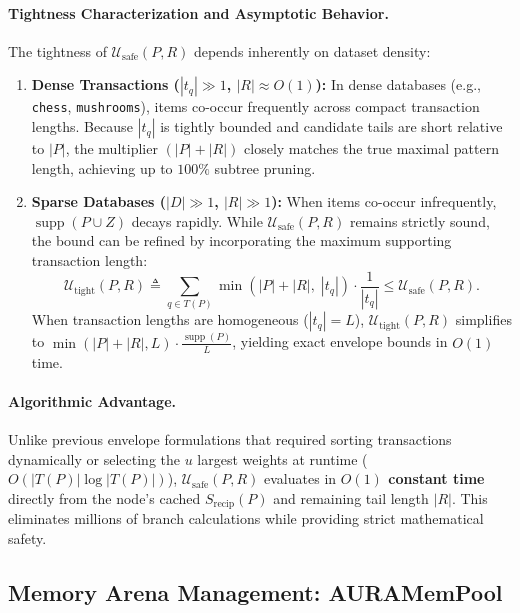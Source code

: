 \documentclass[runningheads,orivec]{llncs}
\newcommand{\supp}{\operatorname{supp}}
\begin{document}
\paragraph{Tightness Characterization and Asymptotic Behavior.}
The tightness of $\mathcal{U}_{\mathrm{safe}}(P, R)$ depends inherently on dataset density:
\begin{enumerate}
    \item \textbf{Dense Transactions ($|t_q| \gg 1$, $|R| \approx O(1)$):} In dense databases (e.g., \texttt{chess}, \texttt{mushrooms}), items co-occur frequently across compact transaction lengths. Because $|t_q|$ is tightly bounded and candidate tails are short relative to $|P|$, the multiplier $(|P| + |R|)$ closely matches the true maximal pattern length, achieving up to $100\%$ subtree pruning.
    \item \textbf{Sparse Databases ($|D| \gg 1$, $|R| \gg 1$):} When items co-occur infrequently, $\supp(P \cup Z)$ decays rapidly. While $\mathcal{U}_{\mathrm{safe}}(P, R)$ remains strictly sound, the bound can be refined by incorporating the maximum supporting transaction length:
    \begin{equation}
    \mathcal{U}_{\mathrm{tight}}(P, R) \triangleq \sum_{q \in T(P)} \min\left(|P| + |R|, \; |t_q|\right) \cdot \frac{1}{|t_q|} \le \mathcal{U}_{\mathrm{safe}}(P, R).
    \end{equation}
    When transaction lengths are homogeneous ($|t_q| = L$), $\mathcal{U}_{\mathrm{tight}}(P, R)$ simplifies to $\min(|P| + |R|, L) \cdot \frac{\supp(P)}{L}$, yielding exact envelope bounds in $O(1)$ time.
\end{enumerate}

\paragraph{Algorithmic Advantage.} Unlike previous envelope formulations that required sorting transactions dynamically or selecting the $u$ largest weights at runtime ($O(|T(P)| \log |T(P)|)$), $\mathcal{U}_{\mathrm{safe}}(P, R)$ evaluates in \textbf{$O(1)$ constant time} directly from the node's cached $S_{\mathrm{recip}}(P)$ and remaining tail length $|R|$. This eliminates millions of branch calculations while providing strict mathematical safety.

\subsection{Memory Arena Management: AURAMemPool}
\end{document}

